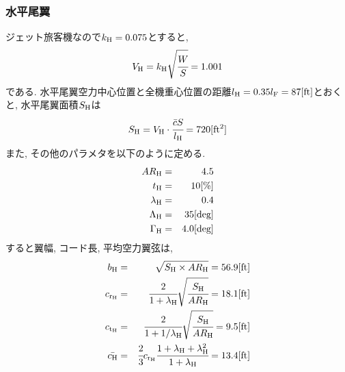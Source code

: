 \documentclass[12pt]{jsarticle}
\begin{document}
\subsubsection{水平尾翼}
ジェット旅客機なので$k_{\rm H} = 0.075$とすると,
\begin{eqnarray*}
V_{\rm H} = k_{\rm H}\sqrt{\cfrac{W}{S}} = 1.001
\end{eqnarray*}
である. 水平尾翼空力中心位置と全機重心位置の距離$l_{\rm H} = 0.35 l_{\rm F} = 87 [{\rm ft}]$とおくと, 水平尾翼面積$S_{\rm H}$は
\begin{eqnarray*}
S_{\rm H} = V_{\rm H} \cdot \cfrac{\bar{c} S}{l_{\rm H}} = 720 [{\rm ft^2}]
\end{eqnarray*}
また, その他のパラメタを以下のように定める.
\begin{eqnarray*}
AR_{\rm H} &=& 4.5 \\
t_{\rm H} &=& 10[\%] \\
\lambda_{\rm H} &=& 0.4 \\
\Lambda_{\rm H} &=& 35 [\rm deg] \\
\Gamma_{\rm H} &=& 4.0 [\rm deg]
\end{eqnarray*}
すると翼幅, コード長, 平均空力翼弦は,
\begin{eqnarray*}
b_{\rm H} &=& \sqrt{S_{\rm H} \times AR_{\rm H}} = 56.9 [\rm ft] \\
c_{\rm r_H} &=& \cfrac{2}{1+\lambda_{\rm H}}\sqrt{\cfrac{S_{\rm H}}{AR_{\rm H}}} = 18.1 [\rm ft] \\
c_{\rm t_H} &=& \cfrac{2}{1+1/\lambda_{\rm H}}\sqrt{\cfrac{S_{\rm H}}{AR_{\rm H}}} = 9.5 [\rm ft] \\
\bar{c_{\rm H}} &=& \cfrac{2}{3}c_{\rm r_H} \cfrac{1 + \lambda_{\rm H} + \lambda_{\rm H}^2}{1 + \lambda_{\rm H}} = 13.4 [\rm ft]
\end{eqnarray*}
\end{document}
